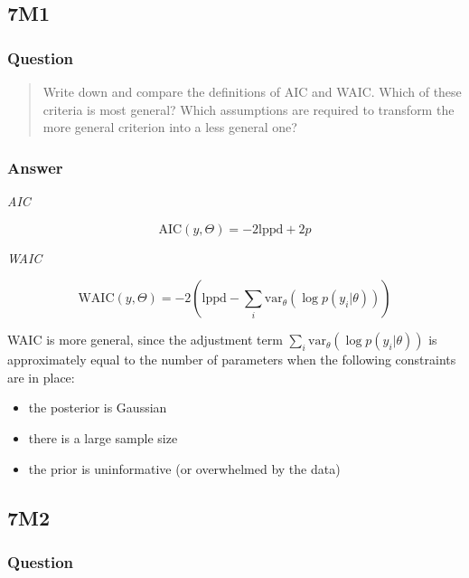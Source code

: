 \documentclass[
]{book}
\providecommand{\tightlist}{%
  \setlength{\itemsep}{0pt}\setlength{\parskip}{0pt}}
\begin{document}
\hypertarget{m1-4}{%
\subsection*{7M1}\label{m1-4}}

\hypertarget{question-64}{%
\subsubsection*{Question}\label{question-64}}

\begin{quote}
Write down and compare the definitions of AIC and WAIC. Which of these criteria is most general? Which assumptions are required to transform the more general criterion into a less general one?
\end{quote}

\hypertarget{answer-64}{%
\subsubsection*{Answer}\label{answer-64}}

\emph{AIC}

\[
\text{AIC}(y,\Theta) = -2 \text{lppd} + 2p
\]

\emph{WAIC}

\[
\text{WAIC}(y,\Theta) = -2 \left( \text{lppd} - \sum_i \text{var}_\theta ( \log p(y_i | \theta)) \right)
\]

WAIC is more general, since the adjustment term \(\sum_i \text{var}_\theta ( \log p(y_i | \theta))\) is approximately equal to the number of parameters when the following constraints are in place:

\begin{itemize}
\tightlist
\item
  the posterior is Gaussian
\item
  there is a large sample size
\item
  the prior is uninformative (or overwhelmed by the data)
\end{itemize}

\hypertarget{m2-4}{%
\subsection*{7M2}\label{m2-4}}

\hypertarget{question-65}{%
\subsubsection*{Question}\label{question-65}}
\end{document}
